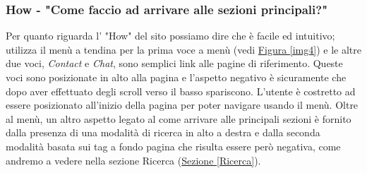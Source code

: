 \subsubsection{How - "Come faccio ad arrivare alle sezioni principali?"} \label{HHow}
Per quanto riguarda l' "How" del sito possiamo dire che è facile ed intuitivo; utilizza il menù a tendina per la prima voce a menù (vedi \hyperref[img4]{Figura \ref{img4}}) e le altre due voci, \textit{Contact} e \textit{Chat}, sono semplici link alle pagine di riferimento.
Queste voci sono posizionate in alto alla pagina e l'aspetto negativo è sicuramente che dopo aver effettuato degli scroll verso il basso spariscono. L'utente è costretto ad essere posizionato all'inizio della pagina per poter navigare usando il menù.
Oltre al menù, un altro aspetto legato al come arrivare alle principali sezioni è fornito dalla presenza di una modalità di ricerca in alto a destra e dalla seconda modalità basata sui tag a fondo pagina che risulta essere però negativa, come andremo a vedere nella sezione Ricerca (\hyperref[Ricerca]{Sezione \ref{Ricerca}}).






